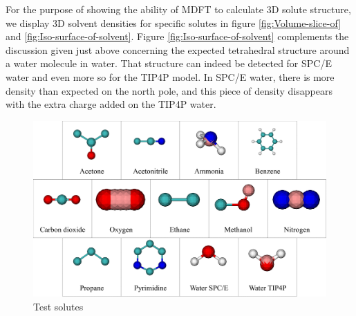 For the purpose of showing the ability of \acs{MDFT} to calculate
3D solute structure, we display 3D solvent densities for specific
solutes in figure \ref{fig:Volume-slice-of} and \ref{fig:Iso-surface-of-solvent}.
Figure \ref{fig:Iso-surface-of-solvent} complements the discussion
given just above concerning the expected tetrahedral structure around
a water molecule in water. That structure can indeed be detected for
SPC/E water and even more so for the TIP4P model. In SPC/E water,
there is more density than expected on the north pole, and this piece
of density disappears with the extra charge added on the TIP4P water.\\

\begin{figure}[H]
\begin{centering}
\includegraphics[width=1\columnwidth]{_figure/app_solute_var}
\par\end{centering}
\caption{Test solutes\label{fig:Test-solutes-2}}
\end{figure}

